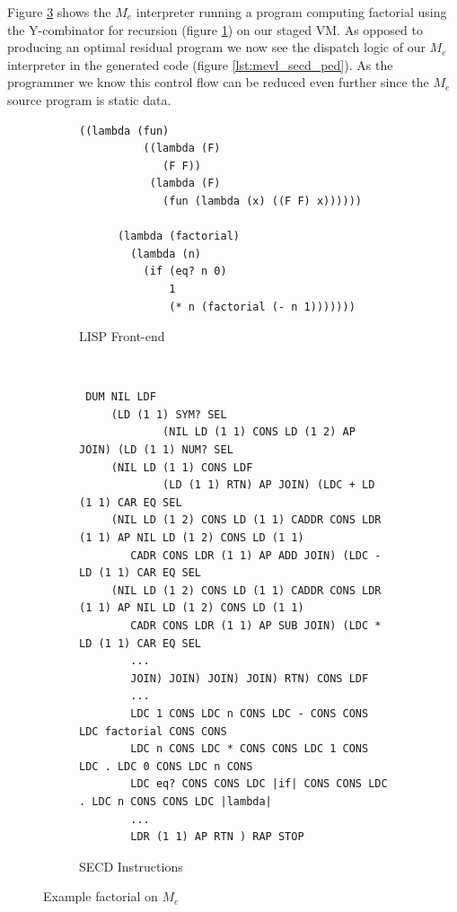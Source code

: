 \documentclass[a4paper,12pt,twoside,openright]{report}
\theoremstyle{definition}
\newcommand{\mevl}{$M_{e}$}
\begin{document}
Figure \ref{lst:mevl_secd_all} shows the \mevl{} interpreter running a program computing factorial using the Y-combinator for recursion (figure \ref{lst:mevl_secd_lisp}) on our staged VM. As opposed to producing an optimal residual program we now see the dispatch logic of our \mevl{} interpreter in the generated code (figure \ref{lst:mevl_secd_ped}). As the programmer we know this control flow can be reduced even further since the \mevl{} source program is static data.


\begin{figure}[htp!]
\centering
    \begin{subfigure}{.5\linewidth}
         \centering
         \begin{verbatim}
((lambda (fun)
          ((lambda (F)
             (F F))
           (lambda (F)
             (fun (lambda (x) ((F F) x))))))

      (lambda (factorial)
        (lambda (n)
          (if (eq? n 0)
              1
              (* n (factorial (- n 1)))))))
         \end{verbatim}
         \caption{LISP Front-end}
         \label{lst:mevl_secd_lisp}
    \end{subfigure}\\[1ex]
    \par\bigskip
    \begin{subfigure}{\linewidth}
         \centering
         \begin{verbatim}
 DUM NIL LDF
     (LD (1 1) SYM? SEL
             (NIL LD (1 1) CONS LD (1 2) AP JOIN) (LD (1 1) NUM? SEL
     (NIL LD (1 1) CONS LDF
             (LD (1 1) RTN) AP JOIN) (LDC + LD (1 1) CAR EQ SEL
     (NIL LD (1 2) CONS LD (1 1) CADDR CONS LDR (1 1) AP NIL LD (1 2) CONS LD (1 1)
        CADR CONS LDR (1 1) AP ADD JOIN) (LDC - LD (1 1) CAR EQ SEL
     (NIL LD (1 2) CONS LD (1 1) CADDR CONS LDR (1 1) AP NIL LD (1 2) CONS LD (1 1)
        CADR CONS LDR (1 1) AP SUB JOIN) (LDC * LD (1 1) CAR EQ SEL
        ...
        JOIN) JOIN) JOIN) JOIN) RTN) CONS LDF
        ...
        LDC 1 CONS LDC n CONS LDC - CONS CONS LDC factorial CONS CONS
        LDC n CONS LDC * CONS CONS LDC 1 CONS LDC . LDC 0 CONS LDC n CONS
        LDC eq? CONS CONS LDC |if| CONS CONS LDC . LDC n CONS CONS LDC |lambda|
        ...
        LDR (1 1) AP RTN ) RAP STOP
         \end{verbatim}
    \caption{SECD Instructions}
    \label{lst:mevl_secd_ops}
    \end{subfigure}
\caption{Example factorial on \mevl}
\label{lst:mevl_secd_all}
\end{figure}
\end{document}

